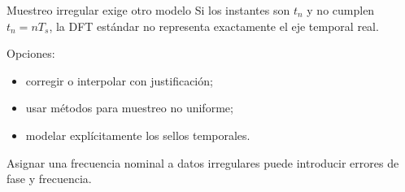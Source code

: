 \documentclass[
  ignorenonframetext,
  aspectratio=169,
  spanish,
]{beamer}
\providecommand{\tightlist}{%
  \setlength{\itemsep}{0pt}\setlength{\parskip}{0pt}}
\begin{document}
\begin{frame}{Muestreo irregular exige otro modelo}
  \protect{}\label{muestreo-irregular-exige-otro-modelo}
  Si los instantes son \(t_n\) y no cumplen \(t_n=nT_s\), la DFT estándar
  no representa exactamente el eje temporal real.

  Opciones:

  \begin{itemize}
    \tightlist
    \item
          corregir o interpolar con justificación;
    \item
          usar métodos para muestreo no uniforme;
    \item
          modelar explícitamente los sellos temporales.
  \end{itemize}

  \begin{tcolorbox}[enhanced jigsaw, arc=.35mm, bottomrule=.15mm, bottomtitle=1mm, breakable, colback=white, colbacktitle=quarto-callout-warning-color!10!white, colframe=quarto-callout-warning-color-frame, coltitle=black, left=2mm, leftrule=.75mm, opacityback=0, opacitybacktitle=0.6, rightrule=.15mm, title=\textcolor{quarto-callout-warning-color}{\faExclamationTriangle}\hspace{0.5em}{Advertencia}, titlerule=0mm, toprule=.15mm, toptitle=1mm]

    Asignar una frecuencia nominal a datos irregulares puede introducir
    errores de fase y frecuencia.

  \end{tcolorbox}
\end{frame}
\end{document}

